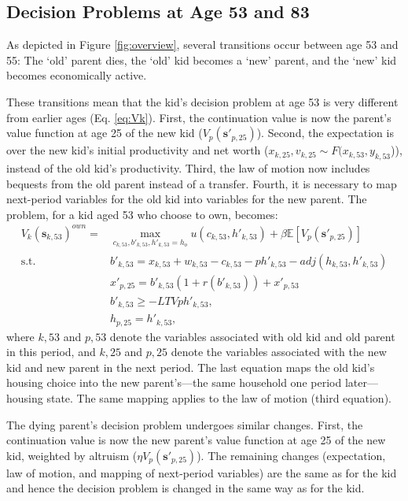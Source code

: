 \documentclass[12pt]{article}
\newcommand{\E}{\mathbb{E}}
\begin{document}
\subsection{Decision Problems at Age 53 and 83}\label{sec:decextra}
As depicted in Figure \ref{fig:overview}, several transitions occur between age 53 and 55: The `old' parent dies, the `old' kid becomes a `new' parent, and the `new' kid becomes economically active. 

These transitions mean that the kid's decision problem at age 53 is very different from earlier ages (Eq. \ref{eq:Vk}). First, the continuation value is now the parent's value function at age 25 of the new kid ($V_{p}({\mathbf{s}'_{p,25}})$). Second, the expectation is over the new kid's initial productivity and net worth ($x_{k,25},v_{k,25}\sim F(x_{k,53},y_{k,53}$)), instead of the old kid's productivity. Third, the law of motion now includes bequests from the old parent instead of a transfer. Fourth, it is necessary to map next-period variables for the old kid into variables for the new parent. The problem, for a kid aged 53 who choose to own, becomes:
\begin{equation*}
\begin{split}
V_k(\mathbf{s}_{k,53})^{own} = &\max_{c_{k,53},b'_{k,53},h'_{k,53}=h_o} u(c_{k,53},h'_{k,53}) + \beta \E\left[V_{p}({\mathbf{s}'_{p,25}}) \right] \\
\text{s.t.}\quad & 	b'_{k,53} = x_{k,53} + w_{k,53} - c_{k,53} - p h'_{k,53} - adj(h_{k,53},h'_{k,53}) \\
& x'_{p,25} = b'_{k,53}(1+r(b'_{k,53})) + x'_{p,53} \\
& b'_{k,53} \ge -LTV p h'_{k,53}, \\
& h_{p,25} = h'_{k,53},
\end{split}
\end{equation*} 
where $k,53$ and $p,53$ denote the variables associated with old kid and old parent in this period, and $k,25$ and $p,25$ denote the variables associated with the new kid and new parent in the next period. The last equation maps the old kid's housing choice into the new parent's---the same household one period later---housing state. The same mapping applies to the law of motion (third equation).

The dying parent's decision problem undergoes similar changes. First, the continuation value is now the new parent's value function at age 25 of the new kid, weighted by altruism ($\eta V_p(\mathbf{s}'_{p,25})$). The remaining changes (expectation, law of motion, and mapping of next-period variables) are the same as for the kid and hence the decision problem is changed in the same way as for the kid.
\end{document}
